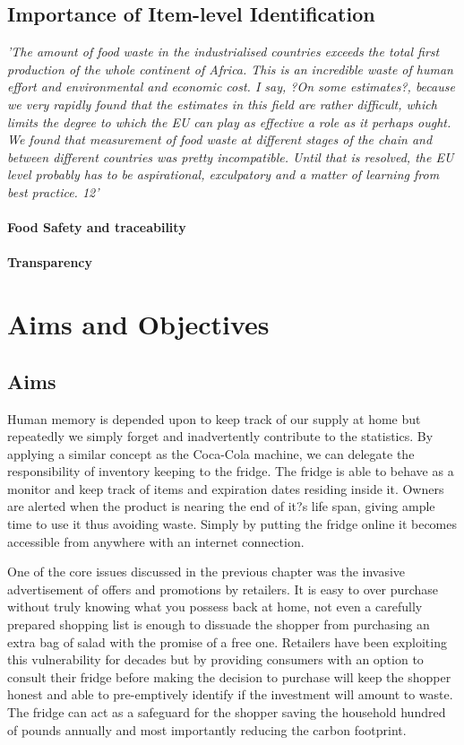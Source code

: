 \documentclass[a4paper, 11pt]{article}
\begin{document}
\subsection{Importance of Item-level Identification}
\emph{'The amount of food waste in the industrialised countries exceeds the total first
production of the whole continent of Africa. This is an incredible waste of human effort
and environmental and economic cost. I say, ?On some estimates?, because we very
rapidly found that the estimates in this field are rather difficult, which limits the degree
to which the EU can play as effective a role as it perhaps ought. We found that
measurement of food waste at different stages of the chain and between different
countries was pretty incompatible. Until that is resolved, the EU level probably has to
be aspirational, exculpatory and a matter of learning from best practice. 12'}
\paragraph{Food Safety and traceability}
\paragraph{Transparency}
\clearpage
\section{Aims and Objectives}
\subsection{Aims}
Human memory is depended upon to keep track of our supply at home but repeatedly we simply forget and inadvertently contribute to the statistics. By applying a similar concept as the Coca-Cola machine, we can delegate the responsibility of inventory keeping to the fridge. The fridge is able to behave as a monitor and keep track of items and expiration dates residing inside it. Owners are alerted when the product is nearing the end of it?s life span, giving ample time to use it thus avoiding waste. Simply by putting the fridge online it becomes accessible from anywhere with an internet connection.

One of the core issues discussed in the previous chapter was the invasive advertisement of offers and promotions by retailers. It is easy to over purchase without truly knowing what you possess back at home, not even a carefully prepared shopping list is enough to dissuade the shopper from purchasing an extra bag of salad with the promise of a free one. Retailers have been exploiting this vulnerability for decades but by providing consumers with an option to consult their fridge before making the decision to purchase will keep the shopper honest and able to pre-emptively identify if the investment will amount to waste. The fridge can act as a safeguard for the shopper saving the household hundred of pounds annually and most importantly reducing the carbon footprint. 
\end{document}
